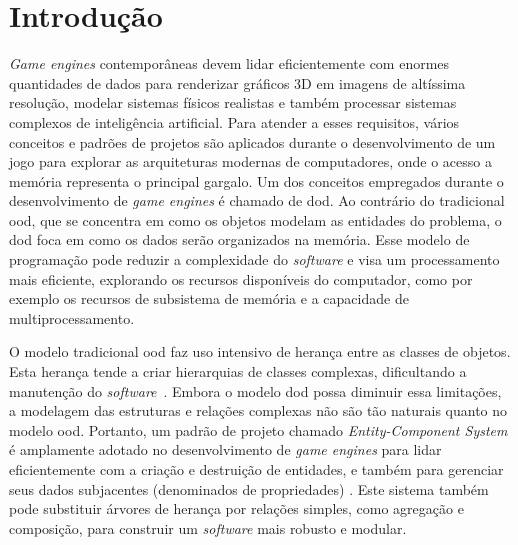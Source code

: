 \acresetall{}
\chapter{Introdução}
\label{cap:introducao}

\textit{Game engines} contemporâneas devem lidar eficientemente com enormes quantidades de dados para renderizar gráficos 3D em imagens de altíssima resolução, modelar sistemas físicos realistas e também processar sistemas complexos de inteligência artificial.
Para atender a esses requisitos, vários conceitos e padrões de projetos são aplicados durante o desenvolvimento de um jogo para explorar as arquiteturas modernas de computadores, onde o acesso a memória representa o principal gargalo. 
Um dos conceitos empregados durante o desenvolvimento de \textit{game engines} é chamado de \ac{dod}. 
Ao contrário do tradicional \ac{ood}, que se concentra em como os objetos modelam as entidades do problema, o \ac{dod} foca em como os dados serão organizados na memória. 
Esse modelo de programação pode reduzir a complexidade do \textit{software} e visa um processamento mais eficiente, explorando os recursos disponíveis do computador, como por exemplo os recursos de subsistema de memória e a capacidade de multiprocessamento.

O modelo tradicional \ac{ood} faz uso intensivo de herança entre as classes de objetos.
Esta herança tende a criar hierarquias de classes complexas, dificultando a manutenção do \textit{software}~\cite{nystrom2014game}. 
Embora o modelo \ac{dod} possa diminuir essa limitações, a modelagem das estruturas e relações complexas não são tão naturais quanto no modelo \ac{ood}.
Portanto, um padrão de projeto chamado \textit{Entity-Component System} é amplamente adotado no desenvolvimento de \textit{game engines} para lidar eficientemente com a criação e destruição de entidades, e também para gerenciar seus dados subjacentes (denominados de propriedades) \cite{wiebusch2015decoupling, zu2014campvis}.
Este sistema também pode substituir árvores de herança por relações simples, como agregação e composição, para construir um \textit{software} mais robusto e modular.


